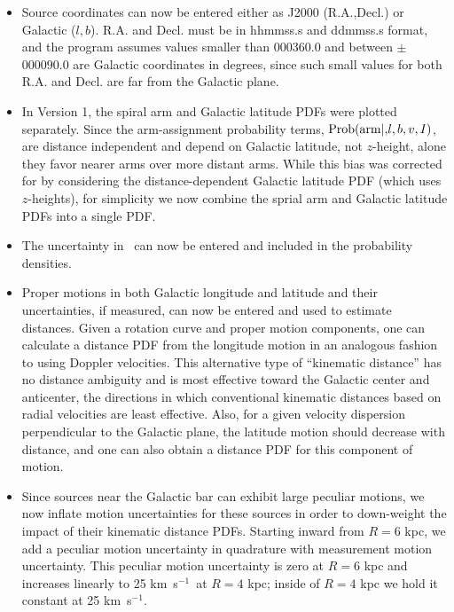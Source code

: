 \documentclass[12pt,preprint]{aastex}
\def\kms  {km~s$^{-1}$}
\def\vlsr  {\ifmmode {v_{\rm LSR}}\else {$v_{\rm LSR}$}\fi}
\begin{document}
\begin{itemize}

\item{}Source coordinates can now be entered either as J2000 (R.A.,Decl.) or Galactic ($l,b$). 
R.A. and Decl. must be in hhmmss.s and ddmmss.s format, and the program assumes values
smaller than 000360.0 and between $\pm$000090.0 are Galactic coordinates in degrees, 
since such small values for both R.A. and Decl. are far from the Galactic plane.

\item{}In Version 1, the spiral arm and Galactic latitude PDFs were plotted separately.
Since the arm-assignment probability terms, ${\rm Prob(arm|,}l,b,v,I{\rm )}$, 
are distance independent and depend on Galactic latitude, not $z$-height, alone they favor 
nearer arms over more distant arms.  While this bias was corrected for by considering the 
distance-dependent Galactic latitude PDF (which uses $z$-heights), for simplicity we now combine 
the sprial arm and Galactic latitude PDFs into a single PDF.

\item{}The uncertainty in \vlsr\ can now be entered and included in the probability densities.

\item{}Proper motions in both Galactic longitude and latitude and their uncertainties, 
if measured, can now be entered and used to estimate distances. 
Given a rotation curve and proper motion components, one can calculate a distance PDF
from the longitude motion in an analogous fashion to using Doppler velocities.  
This alternative type of ``kinematic distance'' \citep{Yamauchi16, Sanna17} has no distance 
ambiguity and is most effective toward the Galactic center and anticenter, the directions in 
which conventional kinematic distances based on radial velocities are least effective.  Also,
for a given velocity dispersion perpendicular to the Galactic plane, the latitude motion
should decrease with distance, and one can also obtain a distance PDF for this component of motion. 

\item{}Since sources near the Galactic bar can exhibit large peculiar motions, we now
inflate motion uncertainties for these sources in order to down-weight the impact of
their kinematic distance PDFs.  Starting inward from $R=6$ kpc, we add a peculiar motion
uncertainty in quadrature with measurement motion uncertainty.  This peculiar motion
uncertainty is zero at $R=6$ kpc and increases linearly to 25 \kms\ at $R=4$ kpc;  
inside of $R=4$ kpc we hold it constant at 25 \kms.


\end{itemize}
\end{document}
